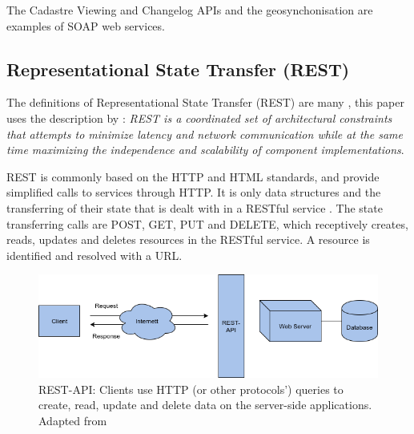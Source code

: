 The Cadastre Viewing and Changelog APIs and the geosynchonisation are examples of SOAP web services. 


\subsection{Representational State Transfer (REST)}
The definitions of Representational State Transfer (REST) are many \citep{Fielding, Richardson}, this paper uses the description by \cite{Fieldinga}: \textit{REST is a coordinated set of architectural constraints that attempts to minimize latency and network communication while at the same time maximizing the independence and scalability of component implementations}. 

REST is commonly based on the HTTP and HTML standards, and provide simplified calls to services through HTTP. It is only data structures and the transferring of their state that is dealt with in a RESTful service \cite{Battle2008}. The state transferring calls are POST, GET, PUT and DELETE, which receptively creates, reads, updates and deletes resources in the RESTful service. A resource is identified and resolved with a URL.

\begin{figure}[H]
	\centering
	\includegraphics[scale=0.5]{img/REST}
	\caption{REST-API: Clients use  HTTP (or other protocols') queries to create, read, update and delete data on the server-side applications.  Adapted from \citep{Ceeb2013} }
	\label{fig:rest}
\end{figure}



